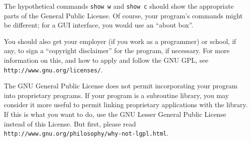 \documentclass[11pt,a4paper]{refrep}
\begin{document}
\begin{fullpage}
\begin{enumerate}
The hypothetical commands {\tt show w} and {\tt show c} should show
the appropriate
parts of the General Public License.  Of course, your program's commands
might be different; for a GUI interface, you would use an ``about box''.

You should also get your employer (if you work as a programmer) or
school, if any, to sign a ``copyright disclaimer'' for the program, if
necessary.  For more information on this, and how to apply and follow
the GNU GPL, see \texttt{http://www.gnu.org/licenses/}.

The GNU General Public License does not permit incorporating your
program into proprietary programs.  If your program is a subroutine
library, you may consider it more useful to permit linking proprietary
applications with the library.  If this is what you want to do, use
the GNU Lesser General Public License instead of this License.  But
first, please read \texttt{http://www.gnu.org/philosophy/why-not-lgpl.html}.

\end{enumerate}
\end{fullpage}


\begin{fullpage}

\end{fullpage}

\clearpage
\remarks
\end{document}
